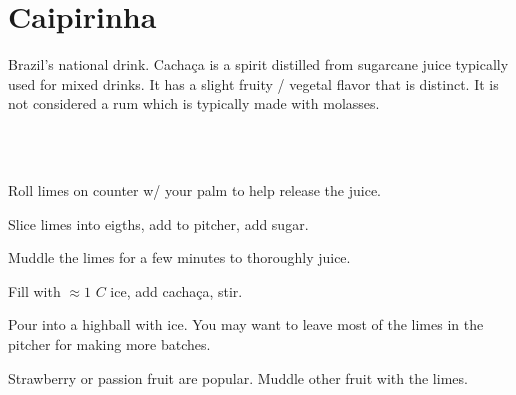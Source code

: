 \section[Caipirinha]{Caipirinha~\vegan}


\begin{recipestats}[
	servings=2,
	preptime=5 \minute,
	source=Kevin \& Marina,
]
\end{recipestats}


\begin{recipeabstract}
	Brazil's national drink.
	Cacha\c{c}a is a spirit distilled from sugarcane juice typically used for mixed drinks.
	It has a slight fruity / vegetal flavor that is distinct.
	It is not considered a rum which is typically made with molasses.
\end{recipeabstract}


\begin{ingredientcolumns}[1]
	\begin{ingredientblock}
		\\
		\\
	\end{ingredientblock}
\end{ingredientcolumns}


\begin{preparation}
\item Roll limes on counter w/ your palm to help release the juice.

\item Slice limes into eigths, add to pitcher, add sugar.

\item Muddle the limes for a few minutes to thoroughly juice.

\item Fill with $\approx 1$ $C$ ice, add cacha\c{c}a, stir.

\item Pour into a highball with ice.
	You may want to leave most of the limes in the pitcher for making more batches.
\end{preparation}


\begin{variation}
\item Strawberry or passion fruit are popular.
	Muddle other fruit with the limes.
\end{variation}


\recipeend
